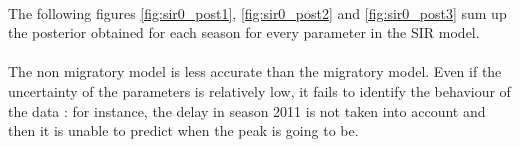 \documentclass[11pt, a4paper]{article}
\begin{document}
\paragraph{}
The following figures \ref{fig:sir0_post1}, \ref{fig:sir0_post2} and \ref{fig:sir0_post3} sum up the posterior obtained for each season for every parameter in the SIR model.

\paragraph{}
The non migratory model is less accurate than the migratory model. Even if the uncertainty of the parameters is relatively low, it fails to identify the behaviour of the data : for instance, the delay in season 2011 is not taken into account and then it is unable to predict when the peak is going to be.
\end{document}
